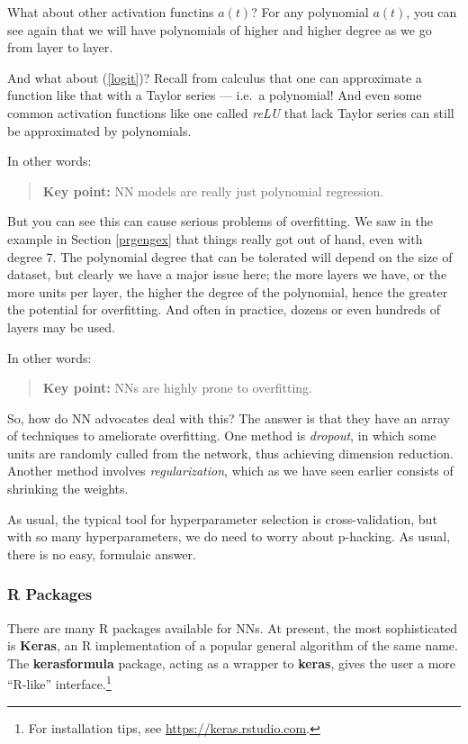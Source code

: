 What about other activation functins $a(t)$?  For any polynomial $a(t)$,
you can see again that we will have polynomials of higher and higher
degree as we go from layer to layer.

And what about (\ref{logit})?  Recall from calculus that one can
approximate a function like that with a Taylor series --- i.e.\ a
polynomial!  And even some common activation functions like one called
\textit{reLU} that lack Taylor series can still be approximated by
polynomials.

In other words:

\begin{quote}
\textbf{Key point:}  NN models are really just polynomial regression.
\end{quote}

But you can see this can cause serious problems of overfitting.  We saw
in the example in Section \ref{prgengex} that things really got out of
hand, even with degree 7.  The polynomial degree that can be tolerated
will depend on the size of dataset, but clearly we have a major issue
here; the more layers we have, or the more units per layer, the higher
the degree of the polynomial, hence the greater the potential for
overfitting.  And often in practice, dozens or even hundreds of layers
may be used.

In other words:

\begin{quote}
\textbf{Key point:}  NNs are highly prone to overfitting.
\end{quote}

So, how do NN advocates deal with this?  The answer is that they have an
array of techniques to ameliorate overfitting.  One method is
\textit{dropout}, in which some units are randomly culled from the
network, thus achieving dimension reduction.  Another method involves
\textit{regularization}, which as we have seen earlier consists of
shrinking the weights.

As usual, the typical tool for hyperparameter selection is
cross-validation, but with so many hyperparameters, we do need to worry
about p-hacking.  As usual, there is no easy, formulaic answer.

\subsubsection{R Packages}

There are many R packages available for NNs.  At present, the most
sophisticated is \textbf{Keras}, an R implementation of a popular
general algorithm of the same name.  The \textbf{kerasformula} package,
acting as a wrapper to \textbf{keras}, gives the user a more ``R-like''
interface.\footnote{For installation tips, see
\url{https://keras.rstudio.com}.}

